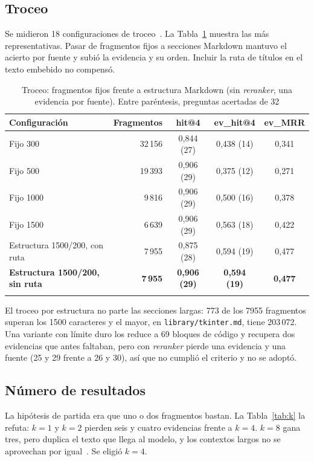\documentclass[pdflatex,sn-mathphys-num]{sn-jnl}
\begin{document}
\subsection{Troceo}\label{sec:res-troceo}

Se midieron 18 configuraciones de troceo~\cite{pineconechunking}. La Tabla~\ref{tab:troceo} muestra las más representativas. Pasar de fragmentos fijos a secciones Markdown mantuvo el acierto por fuente y subió la evidencia y su orden. Incluir la ruta de títulos en el texto embebido no compensó.

\begin{table}[h]
\caption{Troceo: fragmentos fijos frente a estructura Markdown (sin \emph{reranker}, una evidencia por fuente). Entre paréntesis, preguntas acertadas de 32}\label{tab:troceo}
\begin{tabular}{@{}lrccc@{}}
\toprule
Configuración & Fragmentos & hit@4 & ev\_hit@4 & ev\_MRR \\
\midrule
Fijo 300 & 32\,156 & 0,844 (27) & 0,438 (14) & 0,341 \\
Fijo 500 & 19\,393 & 0,906 (29) & 0,375 (12) & 0,271 \\
Fijo 1000 & 9\,816 & 0,906 (29) & 0,500 (16) & 0,378 \\
Fijo 1500 & 6\,639 & 0,906 (29) & 0,563 (18) & 0,422 \\
Estructura 1500/200, con ruta & 7\,955 & 0,875 (28) & 0,594 (19) & 0,477 \\
\textbf{Estructura 1500/200, sin ruta} & \textbf{7\,955} & \textbf{0,906 (29)} & \textbf{0,594 (19)} & \textbf{0,477} \\
\botrule
\end{tabular}
\end{table}

El troceo por estructura no parte las secciones largas: 773 de los 7955 fragmentos superan los 1500 caracteres y el mayor, en \texttt{library/tkinter.md}, tiene 203\,072. Una variante con límite duro los reduce a 69 bloques de código y recupera dos evidencias que antes faltaban, pero con \emph{reranker} pierde una evidencia y una fuente (25 y 29 frente a 26 y 30), así que no cumplió el criterio y no se adoptó.

\subsection{Número de resultados}\label{sec:res-k}

La hipótesis de partida era que uno o dos fragmentos bastan. La Tabla~\ref{tab:k} la refuta: $k=1$ y $k=2$ pierden seis y cuatro evidencias frente a $k=4$. $k=8$ gana tres, pero duplica el texto que llega al modelo, y los contextos largos no se aprovechan por igual~\cite{liu2023lost}. Se eligió $k=4$.
\end{document}
